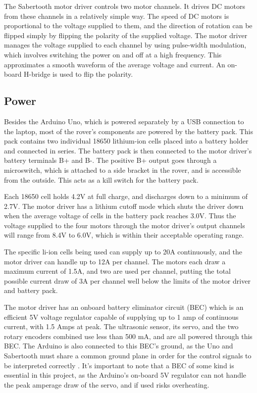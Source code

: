 The Sabertooth motor driver controls two motor channels. It drives DC motors from these channels in a relatively simple way. The speed of DC motors is proportional to the voltage supplied to them, and the direction of rotation can be flipped simply by flipping the polarity of the supplied voltage. The motor driver manages the voltage supplied to each channel by using pulse-width modulation, which involves switching the power on and off at a high frequency. This approximates a smooth waveform of the average voltage and current. An on-board H-bridge is used to flip the polarity. \cite{dcMotorBlog}


\subsection{Power}
Besides the Arduino Uno, which is powered separately by a USB connection to the laptop, most of the rover's components are powered by the battery pack. This pack contains two individual 18650 lithium-ion cells placed into a battery holder and connected in series. The battery pack is then connected to the motor driver's battery terminals B+ and B-. The positive B+ output goes through a microswitch, which is attached to a side bracket in the rover, and is accessible from the outside. This acts as a kill switch for the battery pack.

Each 18650 cell holds 4.2V at full charge, and discharges down to a minimum of 2.7V. The motor driver has a lithium cutoff mode which shuts the driver down when the average voltage of cells in the battery pack reaches 3.0V. Thus the voltage supplied to the four motors through the motor driver's output channels will range from 8.4V to 6.0V, which is within their acceptable operating range.

The specific li-ion cells being used can supply up to 20A continuously, and the motor driver can handle up to 12A per channel. The motors each draw a maximum current of 1.5A, and two are used per channel, putting the total possible current draw of 3A per channel well below the limits of the motor driver and battery pack.

The motor driver has an onboard battery eliminator circuit (BEC) which is an efficient 5V voltage regulator capable of supplying up to 1 amp of continuous current, with 1.5 Amps at peak. The ultrasonic sensor, its servo, and the two rotary encoders combined use less than 500 mA, and are all powered through this BEC.  The Arduino is also connected to this BEC's ground, as the Uno and Sabertooth must share a common ground plane in order for the control signals to be interpreted correctly \cite{sabertoothUserGuide}. It's important to note that a BEC of some kind is essential in this project, as the Arduino's on-board 5V regulator can not handle the peak amperage draw of the servo, and if used risks overheating.

